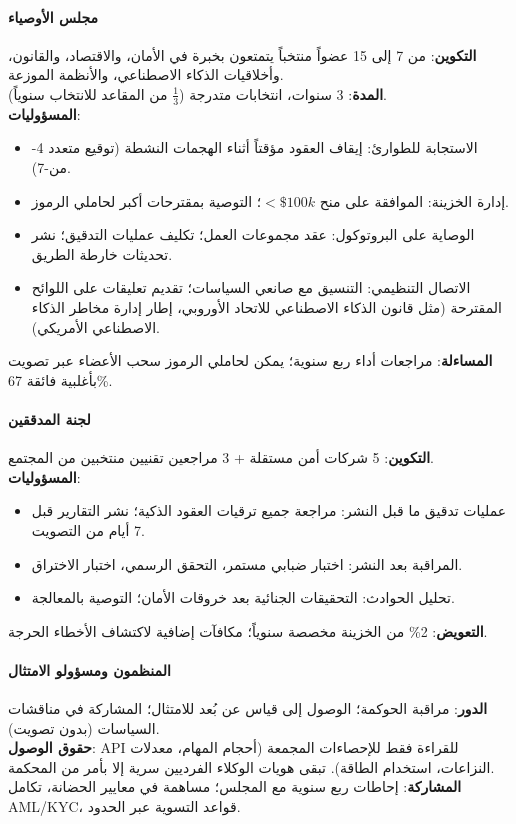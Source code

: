 \documentclass[11pt]{article}
\begin{document}
\paragraph{مجلس الأوصياء}
\textbf{التكوين}: من 7 إلى 15 عضواً منتخباً يتمتعون بخبرة في الأمان، والاقتصاد، والقانون، وأخلاقيات الذكاء الاصطناعي، والأنظمة الموزعة.\\
\textbf{المدة}: 3 سنوات، انتخابات متدرجة ($\frac{1}{3}$ من المقاعد للانتخاب سنوياً).\\
\textbf{المسؤوليات}:
\begin{itemize}[noitemsep]
  \item الاستجابة للطوارئ: إيقاف العقود مؤقتاً أثناء الهجمات النشطة (توقيع متعدد 4-من-7).
  \item إدارة الخزينة: الموافقة على منح $<\$100k$؛ التوصية بمقترحات أكبر لحاملي الرموز.
  \item الوصاية على البروتوكول: عقد مجموعات العمل؛ تكليف عمليات التدقيق؛ نشر تحديثات خارطة الطريق.
  \item الاتصال التنظيمي: التنسيق مع صانعي السياسات؛ تقديم تعليقات على اللوائح المقترحة (مثل قانون الذكاء الاصطناعي للاتحاد الأوروبي، إطار إدارة مخاطر الذكاء الاصطناعي الأمريكي).
\end{itemize}
\textbf{المساءلة}: مراجعات أداء ربع سنوية؛ يمكن لحاملي الرموز سحب الأعضاء عبر تصويت بأغلبية فائقة 67\%.

\paragraph{لجنة المدققين}
\textbf{التكوين}: 5 شركات أمن مستقلة + 3 مراجعين تقنيين منتخبين من المجتمع.\\
\textbf{المسؤوليات}:
\begin{itemize}[noitemsep]
  \item عمليات تدقيق ما قبل النشر: مراجعة جميع ترقيات العقود الذكية؛ نشر التقارير قبل 7 أيام من التصويت.
  \item المراقبة بعد النشر: اختبار ضبابي مستمر، التحقق الرسمي، اختبار الاختراق.
  \item تحليل الحوادث: التحقيقات الجنائية بعد خروقات الأمان؛ التوصية بالمعالجة.
\end{itemize}
\textbf{التعويض}: 2\% من الخزينة مخصصة سنوياً؛ مكافآت إضافية لاكتشاف الأخطاء الحرجة.

\paragraph{المنظمون ومسؤولو الامتثال}
\textbf{الدور}: مراقبة الحوكمة؛ الوصول إلى قياس عن بُعد للامتثال؛ المشاركة في مناقشات السياسات (بدون تصويت).\\
\textbf{حقوق الوصول}: API للقراءة فقط للإحصاءات المجمعة (أحجام المهام، معدلات النزاعات، استخدام الطاقة). تبقى هويات الوكلاء الفرديين سرية إلا بأمر من المحكمة.\\
\textbf{المشاركة}: إحاطات ربع سنوية مع المجلس؛ مساهمة في معايير الحضانة، تكامل AML/KYC، قواعد التسوية عبر الحدود.
\end{document}
